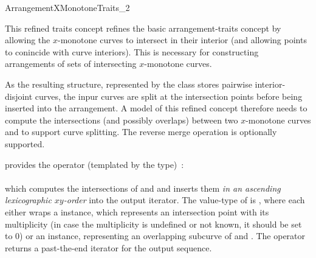 
\ccRefPageBegin

\begin{ccRefConcept}{ArrangementXMonotoneTraits_2}

\ccThreeToTwo

\ccDefinition

This refined traits concept refines the basic arrangement-traits concept
by allowing the $x$-monotone curves to intersect in their interior (and
allowing points to conincide with curve interiors). This is necessary for
constructing arrangements of sets of intersecting $x$-monotone curves.

As the resulting structure, represented by the  class
stores pairwise interior-disjoint curves, the inpur curves are split at
the intersection points before being inserted into the arrangement. 
A model of this refined concept therefore needs to compute the intersections
(and possibly overlaps) between two $x$-monotone curves and to support
curve splitting. The reverse merge operation is optionally supported.

\ccRefines
{}



\ccTypes




\ccThreeToTwo

{provides the operator (templated by the  type)~: \\
  \\
 which computes the intersections of  and  and inserts them
 {\sl in an ascending lexicographic $xy$-order} into the output iterator.
 The value-type of  is , where each
  either wraps a  instance, which
 represents an intersection point with its multiplicity (in case the
 multiplicity is undefined or not known, it should be set to $0$) or an
  instance, representing an overlapping subcurve of
  and . The operator returns a past-the-end iterator
 for the output sequence.}


\end{ccRefConcept}
